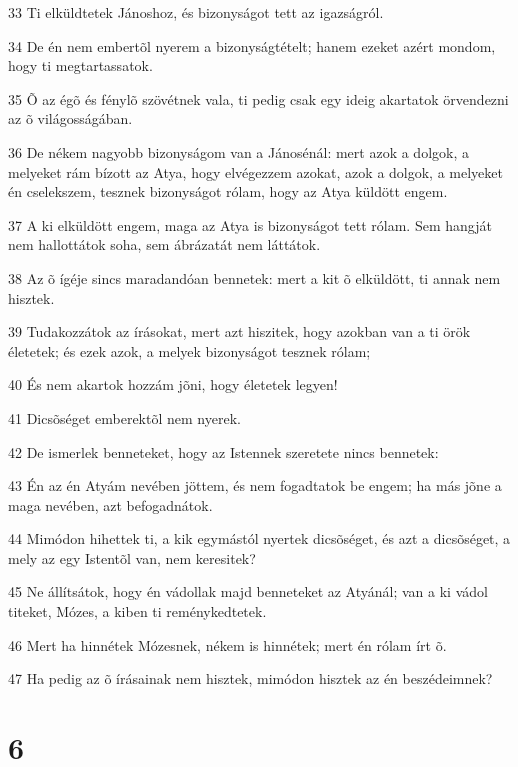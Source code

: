 \par 33 Ti elküldtetek Jánoshoz, és bizonyságot tett az igazságról.
\par 34 De én nem embertõl nyerem a bizonyságtételt; hanem ezeket azért mondom, hogy ti megtartassatok.
\par 35 Õ az égõ és fénylõ szövétnek vala, ti pedig csak egy ideig akartatok örvendezni az õ világosságában.
\par 36 De nékem nagyobb bizonyságom van a Jánosénál: mert azok a dolgok, a melyeket rám bízott az Atya, hogy elvégezzem azokat, azok a dolgok, a melyeket én cselekszem, tesznek bizonyságot rólam, hogy az Atya küldött engem.
\par 37 A ki elküldött engem, maga az Atya is bizonyságot tett rólam. Sem hangját nem hallottátok soha, sem ábrázatát  nem láttátok.
\par 38 Az õ ígéje sincs maradandóan bennetek: mert a kit õ elküldött, ti annak nem hisztek.
\par 39 Tudakozzátok az írásokat, mert azt hiszitek, hogy azokban van a ti örök életetek; és ezek azok, a melyek bizonyságot  tesznek rólam;
\par 40 És nem akartok hozzám jõni, hogy életetek legyen!
\par 41 Dicsõséget emberektõl nem nyerek.
\par 42 De ismerlek benneteket, hogy az Istennek szeretete nincs bennetek:
\par 43 Én az én Atyám nevében jöttem, és nem fogadtatok be engem; ha más jõne a maga nevében, azt befogadnátok.
\par 44 Mimódon hihettek ti, a kik egymástól nyertek dicsõséget, és azt a dicsõséget, a mely az egy Istentõl van, nem keresitek?
\par 45 Ne állítsátok, hogy én vádollak majd benneteket az Atyánál; van a ki vádol titeket, Mózes, a kiben ti reménykedtetek.
\par 46 Mert ha hinnétek Mózesnek, nékem is hinnétek; mert én rólam írt õ.
\par 47 Ha pedig az õ írásainak nem hisztek, mimódon hisztek az én beszédeimnek?

\chapter{6}

